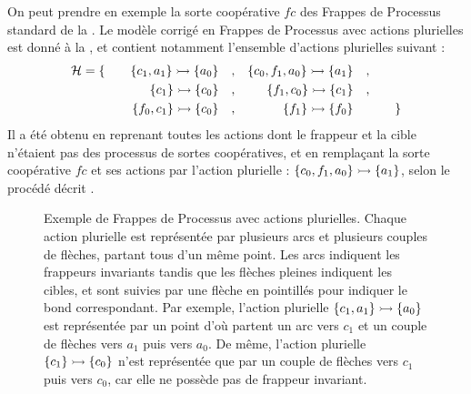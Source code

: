 \begin{example}
  On peut prendre en exemple 
  la sorte coopérative $fc$ des Frappes de Processus standard de la .
  Le modèle corrigé en Frappes de Processus avec actions plurielles
  est donné à la ,
  et contient notamment l'ensemble d'actions plurielles suivant :
  \begin{align*}
    \mathcal{H} = \{\qquad
      \mbox{$\{c_1, a_1\} \rightarrowtail \{a_0\}$}\quad, && \mbox{$\{c_0, f_1, a_0\} \rightarrowtail \{a_1\}$}\quad,& \\
      \mbox{$\{c_1\} \rightarrowtail \{c_0\}$}\quad, && \mbox{$\{f_1, c_0\} \rightarrowtail \{c_1\}$}\quad,& \\
      \mbox{$\{f_0, c_1\} \rightarrowtail \{c_0\}$}\quad,&& \mbox{$\{f_1\} \rightarrowtail \{f_0\}$}\quad\; &
    \qquad\}
  \end{align*}
  Il a été obtenu en reprenant toutes les actions dont le frappeur et la cible
  n'étaient pas des processus de sortes coopératives,
  et en remplaçant la sorte coopérative $fc$ et ses actions par l'action plurielle :
  $\mbox{$\{c_0, f_1, a_0\} \rightarrowtail \{a_1\}$}$,
  selon le procédé décrit .
  
  \begin{figure}[ht]
  \begin{center}
  \caption{%
    Exemple de Frappes de Processus avec actions plurielles.
    Chaque action plurielle est représentée par plusieurs arcs et plusieurs couples de flèches,
    partant tous d'un même point.
    Les arcs indiquent les frappeurs invariants
    tandis que les flèches pleines indiquent les cibles,
    et sont suivies par une flèche en pointillés pour indiquer le bond correspondant.
    Par exemple, l'action plurielle $\mbox{$\{c_1, a_1\} \rightarrowtail \{a_0\}$}$
    est représentée par un point d'où partent un arc vers $c_1$
    et un couple de flèches vers $a_1$ puis vers $a_0$.
    De même, l'action plurielle $\mbox{$\{c_1\} \rightarrowtail \{c_0\}$}$
    n'est représentée que par un couple de flèches vers $c_1$ puis vers $c_0$,
    car elle ne possède pas de frappeur invariant.
  }
  \end{center}
  \end{figure}
\end{example}



